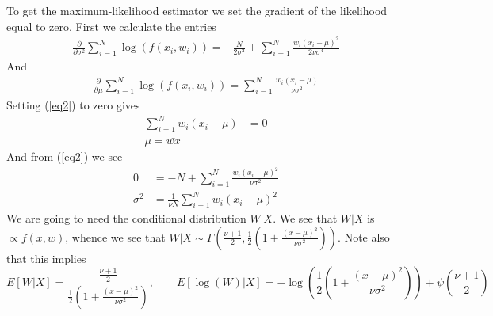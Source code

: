 \documentclass[a4paper, 11 pt]{article}
\begin{document}
To get the maximum-likelihood estimator we set the gradient of the likelihood equal to zero. First we calculate the entries
\begin{align}
    \frac{\partial}{\partial \sigma^2} \sum_{i = 1}^N \log\left(f(x_i,w_i)\right) = -\frac{N}{2\sigma^2} + \sum_{i = 1}^N \frac{w_i(x_i-\mu)^2}{2\nu\sigma^4} \label{eq1}
\end{align}
And 
\begin{align}
    \frac{\partial}{\partial \mu} \sum_{i = 1}^N \log\left(f(x_i,w_i)\right) = \sum_{i = 1}^N \frac{w_i(x_i-\mu)}{\nu \sigma^2} \label{eq2}
\end{align}
Setting (\ref{eq2}) to zero gives
\begin{align*}
    \sum_{i = 1}^N w_i(x_i-\mu) &= 0 \\
    \mu = \bar{wx}
\end{align*}
And from (\ref{eq2}) we see
\begin{align*}
    0 &= - N + \sum_{i = 1}^N \frac{w_i(x_i-\mu)^2}{\nu\sigma^2}\\
    \sigma^2 &= \frac{1}{\nu N} \sum_{i = 1}^N w_i(x_i-\mu)^2
\end{align*}
We are going to need the conditional distribution $W|X$. We see that $W|X$ is $\propto f(x,w)$, whence we see that $W|X\sim \Gamma\left(\frac{\nu+1}{2}, \frac{1}{2}\left(1+\frac{(x-\mu)^2}{\nu\sigma^2}\right)\right)$. Note also that this implies 
\[
    E\left[W|X\right] = \frac{\frac{\nu+1}{2}}{\frac{1}{2}\left(1+\frac{(x-\mu)^2}{\nu\sigma^2}\right)}, \qquad E\left[\log\left(W\right)|X\right] = -\log\left(\frac{1}{2}\left(1+\frac{(x-\mu)^2}{\nu\sigma^2}\right)\right) + \psi\left(\frac{\nu+1}{2}\right)
\]
\end{document}
